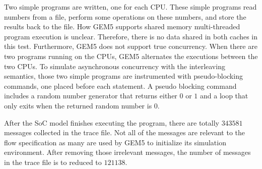 \documentclass[conference]{IEEEtran}
\begin{document}

Two simple programs are written, one for each CPU.  These simple programs read numbers from a file, perform some operations on these numbers, and store the results back to the file.  How GEM5 supports shared memory multi-threaded program execution is unclear.  Therefore, there is no data shared in both caches in this test.  Furthermore, GEM5 does not support true concurrency.  When there are two programs running on the CPUs, GEM5 alternates the executions between the two CPUs.  To simulate asynchronous concurrency with the interleaving semantics, those two simple programs are instrumented with pseudo-blocking commands, one placed before each statement.  A pseudo blocking command includes a random number generator that returns either $0$ or $1$ and a loop that only exits when the returned random number is $0$.  


After the SoC model finishes executing the program, there are totally $343581$ messages collected in the trace file.  Not all of the messages are relevant to the flow specification as many are used by GEM5 to initialize its simulation environment.  After removing those irrelevant messages, the number of messages in the trace file is to reduced to $121138$. 
\end{document}
